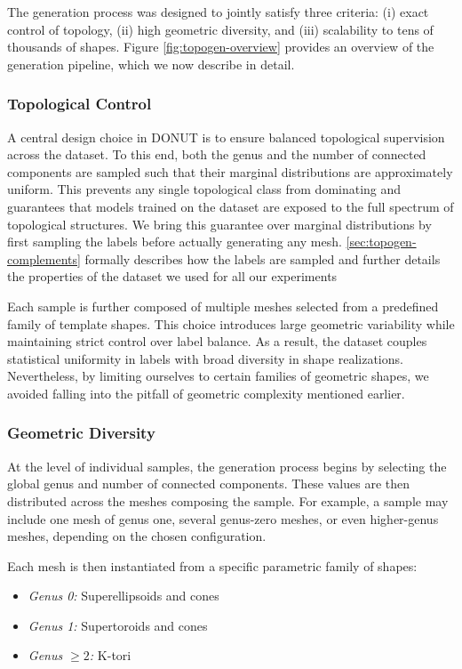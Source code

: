 The generation process was designed to jointly satisfy three criteria: (i) exact control of topology, (ii) high geometric diversity, and (iii) scalability to tens of thousands of shapes. Figure \ref{fig:topogen-overview} provides an overview of the generation pipeline, which we now describe in detail.

\subsubsection{Topological Control}
\label{sssec:labels-distribution}

A central design choice in DONUT is to ensure balanced topological supervision across the dataset. To this end, both the genus and the number of connected components are sampled such that their marginal distributions are approximately uniform. This prevents any single topological class from dominating and guarantees that models trained on the dataset are exposed to the full spectrum of topological structures. We bring this guarantee over marginal distributions by first sampling the labels before actually generating any mesh. \ref{sec:topogen-complements} formally describes how the labels are sampled and further details the properties of the dataset we used for all our experiments

Each sample is further composed of multiple meshes selected from a predefined family of template shapes. This choice introduces large geometric variability while maintaining strict control over label balance. As a result, the dataset couples statistical uniformity in labels with broad diversity in shape realizations. Nevertheless, by limiting ourselves to certain families of geometric shapes, we avoided falling into the pitfall of geometric complexity mentioned earlier. 

\subsubsection{Geometric Diversity}
\label{sssec:sample-level-properties}

At the level of individual samples, the generation process begins by selecting the global genus and number of connected components. These values are then distributed across the meshes composing the sample. For example, a sample may include one mesh of genus one, several genus-zero meshes, or even higher-genus meshes, depending on the chosen configuration.

Each mesh is then instantiated from a specific parametric family of shapes:
\begin{itemize}
  \item \textit{Genus 0:} Superellipsoids and cones
  \item \textit{Genus 1:} Supertoroids and cones
  \item \textit{Genus $\geq 2$:} K-tori
\end{itemize}

